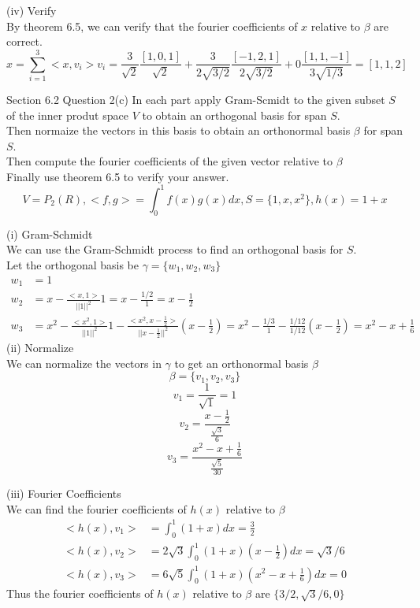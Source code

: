 \documentclass[answers,12pt,addpoints]{exam}
\begin{document}
\begin{questions}
\begin{solution}
        (iv) Verify\\
        By theorem 6.5, we can verify that the fourier coefficients of $x$ relative to $\beta$ are correct.\\
        $$ x = \sum_{i=1}^{3} <x,v_i>v_i = \frac{3}{\sqrt{2}}\frac{[1,0,1]}{\sqrt{2}} + \frac{3}{2\sqrt{3/2}}\frac{[-1,2,1]}{2\sqrt{3/2}} + 0\frac{[1,1,-1]}{3\sqrt{1/3}} = [1,1,2]$$
    \end{solution}
    \question Section 6.2 Question 2(c)
    In each part apply Gram-Scmidt to the given subset $S$ of the inner produt space $V$ to obtain an orthogonal basis for span $S$.\\
    Then normaize the vectors in this basis to obtain an orthonormal basis $\beta$ for span $S$.\\
    Then compute the fourier coefficients of the given vector relative to $\beta$\\
    Finally use theorem 6.5 to verify your answer.\\
    $$ V = P_2(R), <f,g> = \int_{0}^{1}f(x)g(x)dx, S = \{1,x,x^2\}, h(x) = 1+x$$
    \begin{solution}
        (i) Gram-Schmidt\\
        We can use the Gram-Schmidt process to find an orthogonal basis for $S$.\\
        Let the orthogonal basis be $\gamma = \{w_1,w_2,w_3\}$\\
        \begin{align*}
            w_1 &= 1\\
            w_2 &= x - \frac{<x,1>}{||1||^2}1 = x - \frac{1/2}{1} = x - \frac{1}{2}\\
            w_3 &= x^2 - \frac{<x^2,1>}{||1||^2}1 - \frac{<x^2,x-\frac{1}{2}>}{||x-\frac{1}{2}||^2}(x-\frac{1}{2}) = x^2 - \frac{1/3}{1} - \frac{1/12}{1/12}(x-\frac{1}{2}) = x^2 - x + \frac{1}{6}
        \end{align*}
        (ii) Normalize\\
        We can normalize the vectors in $\gamma$ to get an orthonormal basis $\beta$\\
        $$\beta = \{v_1,v_2,v_3\}$$
        $$v_1 = \frac{1}{\sqrt{1}} = 1$$
        $$v_2 = \frac{x-\frac{1}{2}}{\frac{\sqrt{3}}{6}}$$
        $$v_3 = \frac{x^2-x+\frac{1}{6}}{\frac{\sqrt{5}}{30}}$$

        (iii) Fourier Coefficients\\
        We can find the fourier coefficients of $h(x)$ relative to $\beta$\\
        \begin{align*}
            <h(x),v_1> &= \int_{0}^{1}(1+x)dx = \frac{3}{2}\\
            <h(x),v_2> &= 2\sqrt{3} \int_{0}^{1}(1+x)(x-\frac{1}{2}) dx = \sqrt{3}/6\\
            <h(x),v_3> &= 6\sqrt{5} \int_{0}^{1}(1+x)(x^2-x+\frac{1}{6}) dx = 0
        \end{align*}
        Thus the fourier coefficients of $h(x)$ relative to $\beta$ are $\{3/2,\sqrt{3}/6,0\}$\\


\end{solution}
\end{questions}
\end{document}
